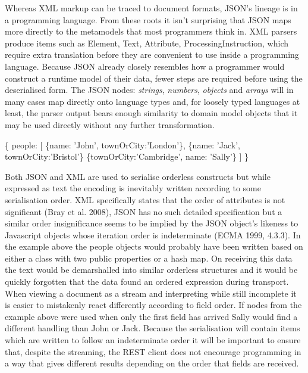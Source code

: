 \documentclass[12pt, ]{article}
\newenvironment{Shaded}{}{}
\newcommand{\DataTypeTok}[1]{\textcolor[rgb]{0.56,0.13,0.00}{{#1}}}
\newcommand{\StringTok}[1]{\textcolor[rgb]{0.25,0.44,0.63}{{#1}}}
\newcommand{\NormalTok}[1]{{#1}}
\begin{document}
Whereas XML markup can be traced to document formats, JSON's lineage is
in a programming language. From these roots it isn't surprising that
JSON maps more directly to the metamodels that most programmers think
in. XML parsers produce items such as Element, Text, Attribute,
ProcessingInstruction, which require extra translation before they are
convenient to use inside a programming language. Because JSON already
closely resembles how a programmer would construct a runtime model of
their data, fewer steps are required before using the deserialised form.
The JSON nodes: \emph{strings}, \emph{numbers}, \emph{objects} and
\emph{arrays} will in many cases map directly onto language types and,
for loosely typed languages at least, the parser output bears enough
similarity to domain model objects that it may be used directly without
any further transformation.

\begin{Shaded}
\begin{Highlighting}[]
\NormalTok{\{}
   \DataTypeTok{people}\NormalTok{: [}
      \NormalTok{\{}\DataTypeTok{name}\NormalTok{: }\StringTok{'John'}\NormalTok{, }\DataTypeTok{townOrCity}\NormalTok{:}\StringTok{'London'}\NormalTok{\},}
      \NormalTok{\{}\DataTypeTok{name}\NormalTok{: }\StringTok{'Jack'}\NormalTok{, }\DataTypeTok{townOrCity}\NormalTok{:}\StringTok{'Bristol'}\NormalTok{\}}
      \NormalTok{\{}\DataTypeTok{townOrCity}\NormalTok{:}\StringTok{'Cambridge'}\NormalTok{, }\DataTypeTok{name}\NormalTok{: }\StringTok{'Sally'}\NormalTok{\}}
   \NormalTok{]}
\NormalTok{\}}
\end{Highlighting}
\end{Shaded}

Both JSON and XML are used to serialise orderless constructs but while
expressed as text the encoding is inevitably written according to some
serialisation order. XML specifically states that the order of
attributes is not significant (Bray et al. 2008), JSON has no such
detailed specification but a similar order insignificance seems to be
implied by the JSON object's likeness to Javascript objects whose
iteration order is indeterminate (ECMA 1999, 4.3.3). In the example
above the people objects would probably have been written based on
either a class with two public properties or a hash map. On receiving
this data the text would be demarshalled into similar orderless
structures and it would be quickly forgotten that the data found an
ordered expression during transport. When viewing a document as a stream
and interpreting while still incomplete it is easier to mistakenly react
differently according to field order. If nodes from the example above
were used when only the first field has arrived Sally would find a
different handling than John or Jack. Because the serialisation will
contain items which are written to follow an indeterminate order it will
be important to ensure that, despite the streaming, the REST client does
not encourage programming in a way that gives different results
depending on the order that fields are received.
\end{document}
